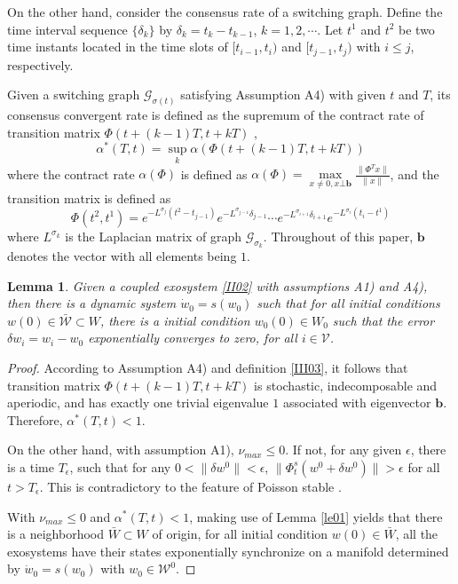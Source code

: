 \documentclass[onecolumn,a4paper,12pt]{article}
\newtheorem{lemma}{Lemma}
\numberwithin{equation}{section}
\begin{document}
On the other hand, consider the consensus rate of a switching graph. Define the time interval sequence $\{\delta_k\}$ by $\delta_k = t_k-t_{k-1}$, $k=1,2,\cdots$. Let $t^1$ and $t^2$ be two time instants located in the time slots of $[t_{i-1}, t_i)$ and $[t_{j-1},t_j)$ with $i\le j$, respectively.

Given a switching graph $\mathcal{G}_{\sigma(t)}$ satisfying Assumption A4) with given $t$ and $T$, its
consensus convergent rate is defined as the supremum of the contract rate of transition matrix $\Phi(t+(k-1)T,t+kT)$ \cite{XiangIJC2011},
\begin{equation}
  \alpha^*(T,t)=\sup_k \alpha(\Phi(t+(k-1)T,t+kT))
\end{equation}
where the contract rate $\alpha(\Phi)$ is defined as $\alpha(\Phi) = \max\limits_{x\neq 0, x\bot \mathbf{b}}\frac{\|\Phi^Tx\|}{\|x\|}$, and the transition matrix is defined as
\begin{equation} \label{III03}
  \Phi(t^2,t^1)=e^{-L^{\sigma_j}(t^2-t_{j-1})}e^{-L^{\sigma_{j-1}}\delta_{j-1}}\cdots e^{-L^{\sigma_{i+1}}\delta_{i+1}}e^{-L^{\sigma_{i}}(t_i-t^1)}
\end{equation}
where $L^{\sigma_k}$ is the Laplacian matrix of graph $\mathcal{G}_{\sigma_k}$. Throughout of this paper, $\mathbf{b}$ denotes the vector with all elements being $1$.

\begin{lemma} \label{le02}
Given a coupled exosystem \eqref{II02} with assumptions A1) and A4), then there is a dynamic system $\dot{w}_0=s(w_0)$ such that for all initial conditions $w(0)\in\mathcal{\bar{W}}\subset W$, there is a initial condition $w_0(0)\in W_0$ such that the error $\delta w_i=w_i-w_0$  exponentially converges to zero, for all $i\in\mathcal{V}$.
\end{lemma}
\begin{proof}
According to Assumption A4) and definition \eqref{III03}, it follows that transition matrix $\Phi(t+(k-1)T,t+kT)$ is stochastic, indecomposable and aperiodic, and has exactly one trivial eigenvalue $1$ associated with eigenvector $\mathbf{b}$. Therefore, $\alpha^*(T,t)<1$.

On the other hand, with assumption A1), $\nu_{max}\le 0$. If not, for any given $\epsilon$, there is a time $T_\epsilon$, such that for any $0<\|\delta w^0\|<\epsilon$, $\|\Phi_t^s(w^0+\delta w^0)\|>\epsilon$ for all $t>T_\epsilon$. This is contradictory to the feature of Poisson stable \cite{IsidoriTAC1990}.

With $\nu_{max}\le0$ and $\alpha^*(T,t)<1$, making use of Lemma \ref{le01} yields that there is a neighborhood $\bar{W}\subset W$ of origin, for all initial condition $w(0)\in\bar{W}$, all the exosystems have their states exponentially synchronize on a manifold determined by $\dot{w}_0=s(w_0)$ with $w_0\in\mathcal{W}^0$.
\end{proof}
\end{document}
